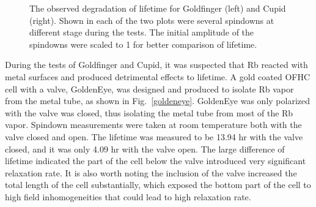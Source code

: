 \begin{figure}[t!]
	\centering
	\caption{{The observed degradation of lifetime for Goldfinger (left) and Cupid (right). Shown in each of the two plots were several spindowns at different stage during the tests. The initial amplitude of the spindowns were scaled to 1 for better comparison of lifetime.}}
	\label{T1_degradation}
\end{figure}

During the tests of Goldfinger and Cupid, it was suspected that Rb reacted with metal surfaces and produced detrimental effects to lifetime. A gold coated OFHC cell with a valve, GoldenEye, was designed and produced to isolate Rb vapor from the metal tube, as shown in Fig.~\ref{goldeneye}. GoldenEye was only polarized with the valve was closed, thus isolating the metal tube from most of the Rb vapor. Spindown measurements were taken at room temperature both with the valve closed and open. The lifetime was measured to be 13.94 hr with the valve closed, and it was only 4.09 hr with the valve open. The large difference of lifetime indicated the part of the cell below the valve introduced very significant relaxation rate. It is also worth noting the inclusion of the valve increased the total length of the cell substantially, which exposed the bottom part of the cell to high field inhomogeneities that could lead to high relaxation rate.

